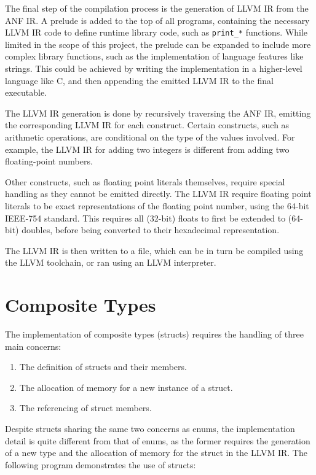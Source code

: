 The final step of the compilation process is the generation of LLVM IR from the ANF IR\@. A prelude
is added to the top of all programs, containing the necessary LLVM IR code to define runtime library
code, such as \texttt{print_*} functions. While limited in the scope of this project, the prelude
can be expanded to include more complex library functions, such as the implementation of language
features like strings. This could be achieved by writing the implementation in a higher-level
language like C, and then appending the emitted LLVM IR to the final executable.

The LLVM IR generation is done by recursively traversing the ANF IR, emitting the corresponding LLVM
IR for each construct. Certain constructs, such as arithmetic operations, are conditional on the
type of the values involved. For example, the LLVM IR for adding two integers is different from
adding two floating-point numbers.

Other constructs, such as floating point literals themselves, require special handling as they
cannot be emitted directly. The LLVM IR require floating point literals to be exact representations
of the floating point number, using the 64-bit IEEE-754 standard. This requires all (32-bit) floats
to first be extended to (64-bit) doubles, before being converted to their hexadecimal
representation.

The LLVM IR is then written to a file, which can be in turn be compiled using the LLVM toolchain, or
ran using an LLVM interpreter.

\section{Composite Types}

The implementation of composite types (structs) requires the handling of three main concerns:

\begin{enumerate}
    \singlespacing
    \item The definition of structs and their members.
    \item The allocation of memory for a new instance of a struct.
    \item The referencing of struct members.
\end{enumerate}

Despite structs sharing the same two concerns as enums, the implementation detail is quite different
from that of enums, as the former requires the generation of a new type and the allocation of memory
for the struct in the LLVM IR\@. The following program demonstrates the use of structs:

